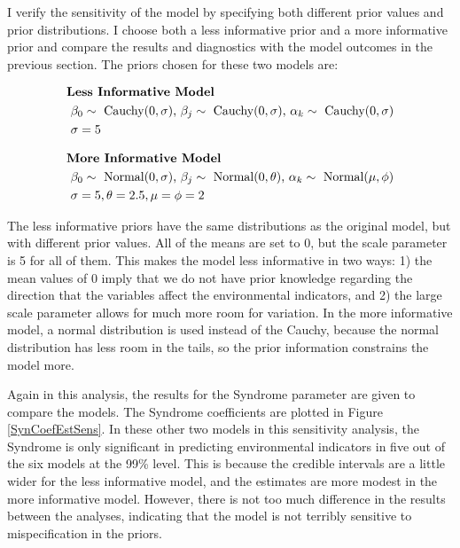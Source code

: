 \documentclass[letterpaper,10.5pt]{article}
\begin{document}
I verify the sensitivity of the model by specifying both different prior values and prior distributions. I choose both a less informative prior and a more informative prior and compare the results and diagnostics with the model outcomes in the previous section. The priors chosen for these two models are:

\begin{equation}
\begin{split}
& \text{\bf{Less Informative Model}} \\
&\text{    } \beta_0 \sim\ \text{Cauchy}(0,\sigma) \text{, } \beta_{j} \sim\ \text{Cauchy}(0,\sigma) \text{, } \alpha_k \sim\ \text{Cauchy}(0,\sigma) \\
&\text{   } \sigma=5
\end{split}
\end{equation}

\begin{equation}
\begin{split}
& \text{\bf{More Informative Model}} \\
&\text{    } \beta_0 \sim\ \text{Normal}(0,\sigma) \text{, } \beta_{j} \sim\ \text{Normal}(0,\theta) \text{, } \alpha_k \sim\ \text{Normal}(\mu,\phi) \\
&\text{   } \sigma=5, \theta=2.5, \mu=\phi=2
\end{split}
\end{equation}

The less informative priors have the same distributions as the original model, but with different prior values. All of the means are set to 0, but the scale parameter is 5 for all of them. This makes the model less informative in two ways: 1) the mean values of 0 imply that we do not have prior knowledge regarding the direction that the variables affect the environmental indicators, and 2) the large scale parameter allows for much more room for variation. In the more informative model, a normal distribution is used instead of the Cauchy, because the normal distribution has less room in the tails, so the prior information constrains the model more.

Again in this analysis, the results for the Syndrome parameter are given to compare the models. The Syndrome coefficients are plotted in Figure \ref{SynCoefEstSens}. In these other two models in this sensitivity analysis, the Syndrome is only significant in predicting environmental indicators in five out of the six models at the 99\% level. This is because the credible intervals are a little wider for the less informative model, and the estimates are more modest in the more informative model. However, there is not too much difference in the results between the analyses, indicating that the model is not terribly sensitive to mispecification in the priors.
\end{document}
